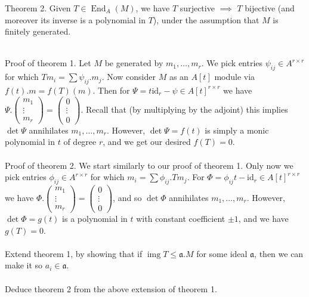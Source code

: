 \documentclass[english]{article}
\def\id{\text{id}}
\newcommand\orange[1]{{\color{orange}{#1}}}
\DeclareMathOperator\End{End}
\DeclareMathOperator\img{img}
\renewcommand{\a}{\mathfrak{a}}
\begin{document}
Theorem 2. Given $T\in\End_A(M)$, we have $T$ surjective $\implies$ $T$ bijective (and moreover its inverse is a polynomial in $T$), under the assumption that $M$ is finitely generated.		\\\\


\newpage


Proof of theorem 1. Let $M$ be generated by $m_1,\dots,m_r$. We pick entries $\psi_{ij}\in A^{r\times r}$ for which $Tm_i=\sum\psi_{ij}.m_j$. Now consider $M$ as an $A[t]$ module via $f(t).m=f(T)(m)$. Then for $\Psi=t\id_r-\psi \in A[t]^{r\times r}$ we have $\Psi.\left(\begin{array}{c}
m_{1}\\
\vdots\\
m_{r}
\end{array}\right)=\left(\begin{array}{c}
0\\
\vdots\\
0
\end{array}\right)$.
Recall that (by multiplying by the adjoint) this implies $\det\Psi$ annihilates $m_1,\dots,m_r$. However, $\det\Psi=f(t)$ is simply a monic polynomial in $t$ of degree $r$, and we get our desired $f(T)=0$.	\\\\


Proof of theorem 2. We start similarly to our proof of theorem 1. Only now we pick entries $\phi_{ij}\in A^{r\times r}$ for which $m_{i}=\sum\phi_{ij}.Tm_{j}$. For $\Phi=\phi_{ij}t-\id_{r}\in A[t]^{r\times r}$ we have $\Phi.\left(\begin{array}{c}
m_{1}\\
\vdots\\
m_{r}
\end{array}\right)=\left(\begin{array}{c}
0\\
\vdots\\
0
\end{array}\right)$, and so $\det\Phi$ annihilates $m_1,\dots,m_r$. However, $\det\Phi=g(t)$ is a polynomial in $t$ with constant coefficient $\pm 1$, and we have $g(T)=0$.	\\\\


\orange{Exercise.} Extend theorem 1, by showing that if $\img T\le \a.M$ for some ideal $\a$, then we can make it so $a_i\in \a$.	\\\\


\orange{Exercise.} Deduce theorem 2 from the above extension of theorem 1.
\end{document}
